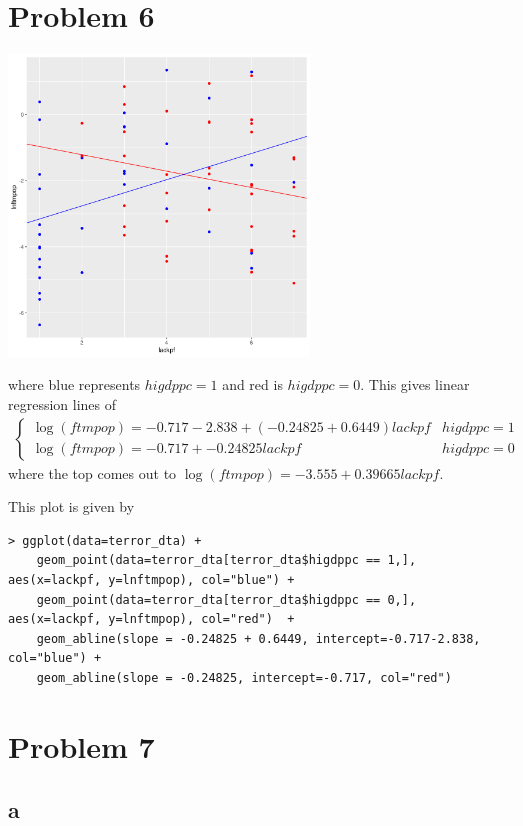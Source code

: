 \documentclass[12pt,letterpaper]{article}
\theoremstyle{definition}
\begin{document}
\section*{Problem 6}
\begin{center}
  \includegraphics[width=0.6\textwidth]{./figures/6.png}
\end{center}
where blue represents $higdppc = 1$ and red is $higdppc = 0$. This gives linear regression lines of
\begin{align*}
  \begin{cases}
    \log(ftmpop) = -0.717-2.838 + (-0.24825 + 0.6449)lackpf & higdppc = 1\\
    \log(ftmpop) = -0.717 + -0.24825 lackpf & higdppc = 0
  \end{cases}
\end{align*}
where the top comes out to $\log(ftmpop) = -3.555 + 0.39665lackpf$.

This plot is given by
\begin{Verbatim}[fontsize=\footnotesize]
> ggplot(data=terror_dta) +
    geom_point(data=terror_dta[terror_dta$higdppc == 1,], aes(x=lackpf, y=lnftmpop), col="blue") +
    geom_point(data=terror_dta[terror_dta$higdppc == 0,], aes(x=lackpf, y=lnftmpop), col="red")  +
    geom_abline(slope = -0.24825 + 0.6449, intercept=-0.717-2.838, col="blue") +
    geom_abline(slope = -0.24825, intercept=-0.717, col="red")
\end{Verbatim}

\section*{Problem 7}
\subsection*{a}
\end{document}

